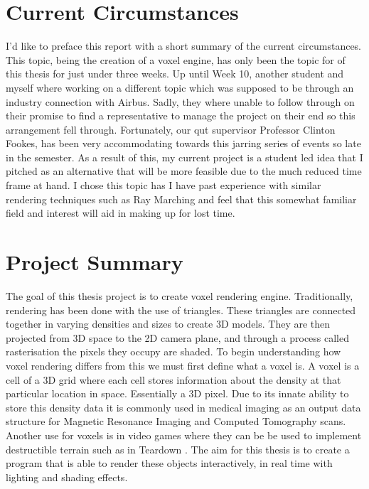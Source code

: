 \documentclass[titlepage]{article}
\begin{document}
\tableofcontents
\listoffigures
\printnoidxglossary[type=\acronymtype]
\newpage

\section{Current Circumstances}
I'd like to preface this report with a short summary of the current circumstances. This topic, being the creation of a voxel engine, has only been the topic for of this thesis for just under three weeks. Up until Week 10, another student and myself where working on a different topic which was supposed to be through an industry connection with Airbus. Sadly, they where unable to follow through on their promise to find a representative to manage the project on their end so this arrangement fell through. Fortunately, our \acrfull{qut} supervisor Professor Clinton Fookes, has been very accommodating towards this jarring series of events so late in the semester. As a result of this, my current project is a student led idea that I pitched as an alternative that will be more feasible due to the much reduced time frame at hand. I chose this topic has I have past experience with similar rendering techniques such as Ray Marching and feel that this somewhat familiar field and interest will aid in making up for lost time.

\section{Project Summary}
The goal of this thesis project is to create voxel rendering engine. Traditionally, rendering has been done with the use of triangles. These triangles are connected together in varying densities and sizes to create 3D models. They are then projected from 3D space to the 2D camera plane, and through a process called rasterisation the pixels they occupy are shaded. To begin understanding how voxel rendering differs from this we must first define what a voxel is. A voxel is a cell of a 3D grid where each cell stores information about the density at that particular location in space. Essentially a 3D pixel. Due to its innate ability to store this density data it is commonly used in medical imaging as an output data structure for Magnetic Resonance Imaging and Computed Tomography scans. Another use for voxels is in video games where they can be be used to implement destructible terrain such as in Teardown \cite{teardown:steam}. The aim for this thesis is to create a program that is able to render these objects interactively, in real time with lighting and shading effects.
\end{document}
